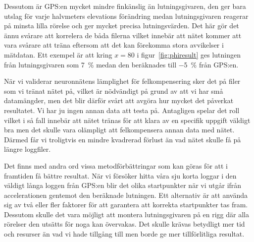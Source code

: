 {Dessutom är GPS:en mycket mindre finkänslig än lutningsgivaren, den ger bara
utslag för varje halvmeters elevations förändring medan lutningsgivaren reagerar
på minsta lilla rörelse och ger mycket precisa lutningsvärden.
Det här gör det ännu svårare att korrelera de båda filerna vilket innebär att
nätet kommer att vara svårare att träna eftersom att det kan förekomma stora
avvikelser i mätdatan.
Ett exempel är att kring $x = 80$ i figur~\ref{fig:phiresult} ges
lutningen från lutningsgivaren som \SI{7}{\percent} medan den beräknades till
\SI{-5}{\percent} från GPS:en.

När vi validerar neuronnätens lämplighet för felkompensering sker det på filer
som vi tränat nätet på,
vilket är nödvändigt på grund av att vi har små datamängder, men det blir därför
svårt att avgöra hur mycket det påverkat resultatet.
Vi har ju ingen annan data att testa på.
Antagligen spelar det roll vilket i så fall innebär att nätet tränas för att
klara av en specifik uppgift väldigt bra men det skulle vara olämpligt att
felkompensera annan data med nätet.
Därmed får vi troligtvis en mindre kvadrerad förlust än vad nätet skulle få på
längre loggfiler.

Det finns med andra ord vissa metodförbättringar som kan göras för att i
framtiden få bättre resultat.
När vi försöker hitta våra sju korta loggar i den väldigt långa loggen från
GPS:en blir det olika startpunkter när vi utgår ifrån accelerationen
gentemot den beräknade lutningen.
Ett alternativ är att använda sig av två eller fler faktorer för
att garantera att korrekta startpunkter tas fram.
Dessutom skulle det vara möjligt att montera lutningsgivaren på en rigg där alla rörelser
den utsätts för noga kan övervakas. Det skulle krävas betydligt mer tid
och resurser än vad vi hade tillgång till men borde ge mer tillförlitliga
resultat.
}
